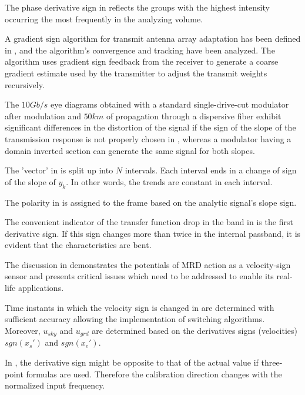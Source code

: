 \documentclass[11pt]{book}
\begin{document}
The phase derivative sign in \cite{antar1999temporal} reflects the
groups with the highest intensity occurring the most frequently in
the analyzing volume.

A gradient sign algorithm for transmit antenna array adaptation has
been defined in \cite{banister2003simple}, and the algorithm's convergence
and tracking have been analyzed. The algorithm uses gradient sign
feedback from the receiver to generate a coarse gradient estimate
used by the transmitter to adjust the transmit weights recursively.

The $10Gb/s$ eye diagrams obtained with a standard single-drive-cut
modulator after modulation and $50km$ of propagation through a dispersive
fiber exhibit significant differences in the distortion of the signal
if the sign of the slope of the transmission response is not properly
chosen in \cite{courjal2004modeling}, whereas a modulator having
a domain inverted section can generate the same signal for both slopes.

The 'vector' in \cite{vazquez2012characterisation} is split up into
$N$ intervals. Each interval ends in a change of sign of the slope
of $y_{k}$. In other words, the trends are constant in each interval.

The polarity in \cite{govind2014automatic} is assigned to the frame
based on the analytic signal's slope sign.

The convenient indicator of the transfer function drop in the band
in \cite{vreznivcek2016amti} is the first derivative sign. If this
sign changes more than twice in the internal passband, it is evident
that the characteristics are bent.

The discussion in \cite{sapinski2017laboratory} demonstrates the
potentials of MRD action as a velocity-sign sensor and presents critical
issues which need to be addressed to enable its real-life applications.

Time instants in which the velocity sign is changed in \cite{rosol2019ability}
are determined with sufficient accuracy allowing the implementation
of switching algorithms. Moreover, $u_{sky}$ and $u_{grd}$ are determined
based on the derivatives signs (velocities) $sgn\left(x_{s}'\right)$
and $sgn\left(x_{e}'\right)$.

In \cite{yin2020background}, the derivative sign might be opposite
to that of the actual value if three-point formulas are used. Therefore
the calibration direction changes with the normalized input frequency.

\end{document}
